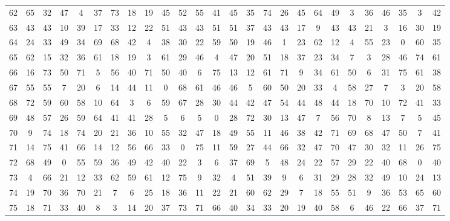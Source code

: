 \begin{table}
\begin{tabular}{c c c c c c c c c c c c c c c c c c c c c c c c c c }
62 & 65 & 32 & 47 & 4 & 37 & 73 & 18 & 19 & 45 & 52 & 55 & 41 & 45 & 35 & 74 & 26 & 45 & 64 & 49 & 3 & 36 & 46 & 35 & 3 & 42 \\
63 & 43 & 43 & 10 & 39 & 17 & 33 & 12 & 22 & 51 & 43 & 43 & 51 & 51 & 37 & 43 & 43 & 17 & 9 & 43 & 43 & 21 & 3 & 16 & 30 & 19 \\
64 & 24 & 33 & 49 & 34 & 69 & 68 & 42 & 4 & 38 & 30 & 22 & 59 & 50 & 19 & 46 & 1 & 23 & 62 & 12 & 4 & 55 & 23 & 0 & 60 & 35 \\
65 & 62 & 15 & 32 & 36 & 61 & 18 & 19 & 3 & 61 & 29 & 46 & 4 & 47 & 20 & 51 & 18 & 37 & 23 & 34 & 7 & 3 & 28 & 46 & 74 & 61 \\
66 & 16 & 73 & 50 & 71 & 5 & 56 & 40 & 71 & 50 & 40 & 6 & 75 & 13 & 12 & 61 & 71 & 9 & 34 & 61 & 50 & 6 & 31 & 75 & 61 & 38 \\
67 & 55 & 55 & 7 & 20 & 6 & 14 & 44 & 11 & 0 & 68 & 61 & 46 & 46 & 5 & 60 & 50 & 20 & 33 & 4 & 58 & 27 & 7 & 3 & 20 & 58 \\
68 & 72 & 59 & 60 & 58 & 10 & 64 & 3 & 6 & 59 & 67 & 28 & 30 & 44 & 42 & 47 & 54 & 44 & 48 & 44 & 18 & 70 & 10 & 72 & 41 & 33 \\
69 & 48 & 57 & 26 & 59 & 64 & 41 & 41 & 28 & 5 & 6 & 5 & 0 & 28 & 72 & 30 & 13 & 47 & 7 & 56 & 70 & 8 & 13 & 7 & 5 & 45 \\
70 & 9 & 74 & 18 & 74 & 20 & 21 & 36 & 10 & 55 & 32 & 47 & 18 & 49 & 55 & 11 & 46 & 38 & 42 & 71 & 69 & 68 & 47 & 50 & 7 & 41 \\
71 & 14 & 75 & 41 & 66 & 14 & 12 & 56 & 66 & 33 & 0 & 75 & 11 & 59 & 27 & 44 & 66 & 32 & 47 & 70 & 47 & 30 & 32 & 11 & 26 & 75 \\
72 & 68 & 49 & 0 & 55 & 59 & 36 & 49 & 42 & 40 & 22 & 3 & 6 & 37 & 69 & 5 & 48 & 24 & 22 & 57 & 29 & 22 & 40 & 68 & 0 & 40 \\
73 & 4 & 66 & 21 & 12 & 33 & 62 & 59 & 61 & 12 & 75 & 9 & 32 & 4 & 51 & 39 & 9 & 6 & 31 & 29 & 28 & 32 & 49 & 10 & 24 & 13 \\
74 & 19 & 70 & 36 & 70 & 21 & 7 & 6 & 25 & 18 & 36 & 11 & 22 & 21 & 60 & 62 & 29 & 7 & 18 & 55 & 51 & 9 & 36 & 53 & 65 & 60 \\
75 & 18 & 71 & 33 & 40 & 8 & 3 & 14 & 20 & 37 & 73 & 71 & 66 & 40 & 34 & 33 & 20 & 19 & 40 & 58 & 6 & 46 & 22 & 66 & 37 & 71 \\
\hline
\end{tabular}
\end{table}